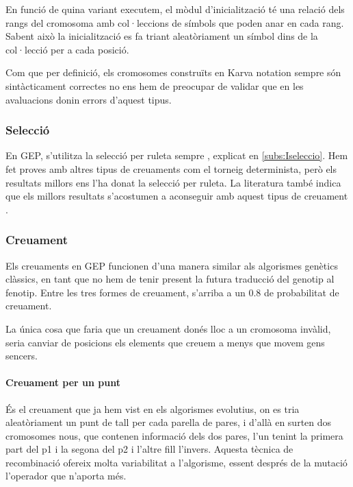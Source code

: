 En funció de quina variant executem, el mòdul  d'inicialització té una relació
dels rangs del cromosoma amb col·leccions de símbols que poden anar en cada
rang.  Sabent això la inicialització es fa triant aleatòriament un símbol dins
de la col·lecció per a cada posició.

Com que per definició, els cromosomes construïts en Karva notation sempre són
sintàcticament correctes no ens hem de preocupar de validar que en les
avaluacions donin errors d'aquest tipus.

\subsubsection{Selecció} %
\label{ssub:Seleccio}

En GEP, s'utilitza la selecció per ruleta sempre , explicat en
\ref{subs:Iseleccio}.  Hem fet proves amb altres tipus de creuaments com el
torneig determinista, però els resultats millors ens l'ha donat la selecció per
ruleta.  La literatura també indica que els millors resultats s'acostumen a
aconseguir amb aquest tipus de creuament
\cite{ferreira:2001,ferreira:2006,ferreira:2007}.

\subsubsection{Creuament} %
\label{Gssub:Creuament}

Els creuaments en GEP funcionen d'una manera similar als algorismes genètics
clàssics, en tant que no hem de tenir present la futura traducció del genotip al
fenotip.  Entre les tres formes de creuament, s'arriba a un 0.8 de probabilitat
de creuament.

La única cosa que faria que un creuament donés lloc a un cromosoma invàlid,
seria canviar de posicions els elements que creuem a menys que movem gens
sencers.

\paragraph{Creuament per un punt} %
\label{par:Creuament per un punt}
És el creuament que ja hem vist en els algorismes evolutius, on es tria
aleatòriament un punt de tall per cada parella de pares, i d'allà en surten dos
cromosomes nous, que contenen informació dels dos pares, l'un tenint la primera
part del p1 i la segona del p2 i l'altre fill l'invers.  Aquesta tècnica de
recombinació ofereix molta variabilitat a l'algorisme, essent després de la
mutació l'operador que n'aporta més.
